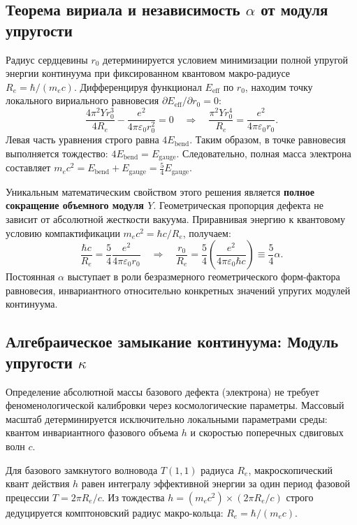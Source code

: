 \documentclass[11pt,a4paper]{article}
\begin{document}
	\subsection{Теорема вириала и независимость $\alpha$ от модуля упругости}
	Радиус сердцевины $r_0$ детерминируется условием минимизации полной упругой энергии континуума при фиксированном квантовом макро-радиусе $R_e = \hbar / (m_e c)$.
	Дифференцируя функционал $E_{\text{eff}}$ по $r_0$, находим точку локального вириального равновесия $\partial E_{\text{eff}} / \partial r_0 = 0$:
	\begin{equation}
		\frac{4 \pi^2 Y r_0^3}{4R_e} - \frac{e^2}{4\pi\varepsilon_0 r_0^2} = 0 \quad \Longrightarrow \quad \frac{\pi^2 Y r_0^4}{R_e} = \frac{e^2}{4\pi\varepsilon_0 r_0}.
	\end{equation}
	Левая часть уравнения строго равна $4 E_{\text{bend}}$. Таким образом, в точке равновесия выполняется тождество: $4 E_{\text{bend}} = E_{\text{gauge}}$.
	Следовательно, полная масса электрона составляет $m_e c^2 = E_{\text{bend}} + E_{\text{gauge}} = \frac{5}{4} E_{\text{gauge}}$. 
	
	Уникальным математическим свойством этого решения является \textbf{полное сокращение объемного модуля $Y$}. Геометрическая пропорция дефекта не зависит от абсолютной жесткости вакуума. Приравнивая энергию к квантовому условию компактификации $m_e c^2 = \hbar c / R_e$, получаем:
	\begin{equation}
		\frac{\hbar c}{R_e} = \frac{5}{4} \frac{e^2}{4\pi\varepsilon_0 r_0} \quad \Longrightarrow \quad \frac{r_0}{R_e} = \frac{5}{4} \left( \frac{e^2}{4\pi\varepsilon_0 \hbar c} \right) \equiv \frac{5}{4} \alpha.
	\label{alpha_derivation}
	\end{equation}
	Постоянная $\alpha$ выступает в роли безразмерного геометрического форм-фактора равновесия, инвариантного относительно конкретных значений упругих модулей континуума.
	
	\subsection{Алгебраическое замыкание континуума: Модуль упругости $\kappa$}
	Определение абсолютной массы базового дефекта (электрона) не требует феноменологической калибровки через космологические параметры. Массовый масштаб детерминируется исключительно локальными параметрами среды: квантом инвариантного фазового объема $h$ и скоростью поперечных сдвиговых волн $c$.
	
	Для базового замкнутого волновода $T(1,1)$ радиуса $R_e$, макроскопический квант действия $h$ равен интегралу эффективной энергии за один период фазовой прецессии $T = 2\pi R_e/c$. Из тождества $h = (m_e c^2) \times (2\pi R_e/c)$ строго дедуцируется комптоновский радиус макро-кольца: $R_e = \hbar / (m_e c)$. 
	
\end{document}

